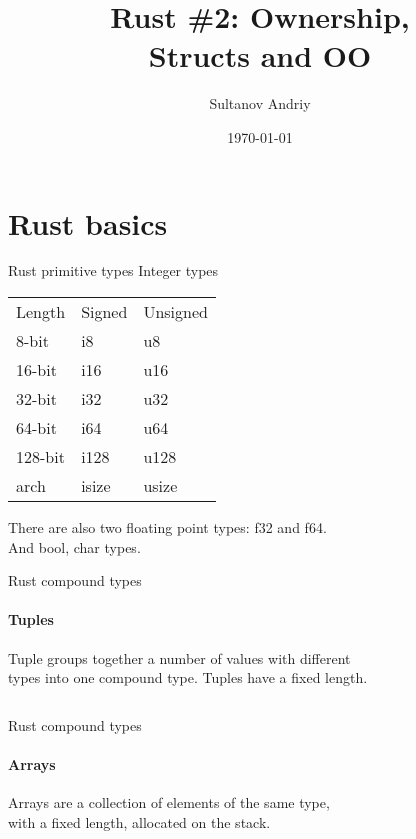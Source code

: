 \documentclass[usenames,dvipsnames,10pt,aspectratio=169]{beamer}
\title[Rust \#2]{Rust \#2: Ownership,\\ Structs and OO}
\date[\today]{\small\today}
\author[Sultanov Andriy]{Sultanov Andriy}
\institute{APPS@UCU}
\begin{document}
\begin{frame}
\titlepage
\end{frame}

\begin{frame}{\contentsname}
\tableofcontents
\end{frame}


\section{Rust basics}
\begin{frame}{Rust primitive types} 
\centering
\large
Integer types
\begin{table}[]
\begin{tabular}{lll}
Length  & Signed & Unsigned \\
8-bit   & i8     & u8       \\
16-bit  & i16    & u16      \\
32-bit  & i32    & u32      \\
64-bit  & i64    & u64      \\
128-bit & i128   & u128     \\
arch    & isize  & usize   
\end{tabular}
\end{table}
\vspace{0.5cm}
There are also two floating point types:
\textcolor{ucuyellow}{f32} and \textcolor{ucuyellow}{f64}.\\
And \textcolor{ucuyellow}{bool}, \textcolor{ucuyellow}{char} types.
\end{frame}

\begin{frame}{Rust compound types}
\framesubtitle{Tuples}
Tuple groups together a number of values with different\\
types into one compound type. Tuples have a fixed length.\\
\vspace{0.2cm}
\inputminted[fontsize=\large]{rust}{code/tuple.rs}
\vspace{0.5cm}
\end{frame}

\begin{frame}{Rust compound types}
\framesubtitle{Arrays}
Arrays are a collection of elements of the same type,\\
with a fixed length, allocated on the stack.
\vspace{0.2cm}
\inputminted[fontsize=\large]{rust}{code/array.rs}
\vspace{0.5cm}
\end{frame}
\end{document}
